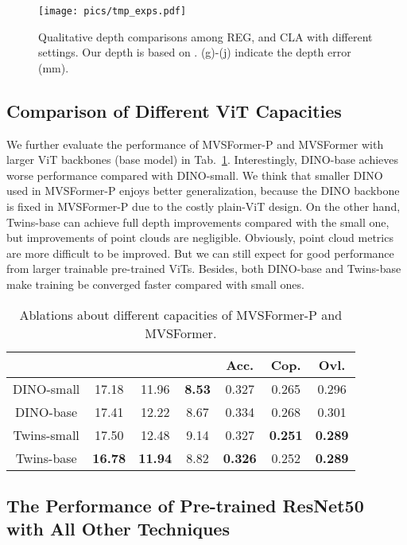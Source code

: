 \documentclass[10pt]{article} \usepackage[preprint]{tmlr}
\begin{document}
 \begin{figure}[h]
 \begin{centering}
 \texttt{[image: pics/tmp\_exps.pdf]} 
 \par\end{centering}
\caption{Qualitative depth comparisons among REG, and CLA with different  settings. Our depth is based on . (g)-(j) indicate the depth error (mm).}
 \label{fig:tmp_exps}
 \vspace{-0.15in}
 \end{figure}

\subsection{Comparison of Different ViT Capacities}
\label{sec:appendix_vit_capacity}

We further evaluate the performance of MVSFormer-P and MVSFormer with larger ViT backbones (base model) in Tab.~\ref{tab:model_capacity}. Interestingly, DINO-base achieves worse performance compared with DINO-small. We think that smaller DINO~\citep{caron2021emerging} used in MVSFormer-P enjoys better generalization, because the DINO backbone is fixed in MVSFormer-P due to the costly plain-ViT design. On the other hand, Twins-base can achieve full depth improvements compared with the small one, but improvements of point clouds are negligible. Obviously, point cloud metrics are more difficult to be improved. But we can still expect for good performance from larger trainable pre-trained ViTs. Besides, both DINO-base and Twins-base make training be converged faster compared with small ones.

\begin{table}[h]
 \caption{Ablations about different capacities of MVSFormer-P and MVSFormer.
 \label{tab:model_capacity}}
 \small
 \centering
\begin{tabular}{ccccccc}
\toprule 
 &  &  &  & Acc. & Cop. & Ovl.\tabularnewline
\midrule
DINO-small & 17.18 & 11.96 & \textbf{8.53} & 0.327 & 0.265 & 0.296\tabularnewline
DINO-base & 17.41 & 12.22 & 8.67 & 0.334 & 0.268 & 0.301\tabularnewline
Twins-small & 17.50 & 12.48 & 9.14 & 0.327 & \textbf{0.251} & \textbf{0.289}\tabularnewline
Twins-base & \textbf{16.78} & \textbf{11.94} & 8.82 & \textbf{0.326} & 0.252 & \textbf{0.289}\tabularnewline
\bottomrule
\end{tabular}
\end{table}

\subsection{The Performance of Pre-trained ResNet50 with All Other Techniques}
\label{sec:appendix_resnet50_discussion}
\end{document}
